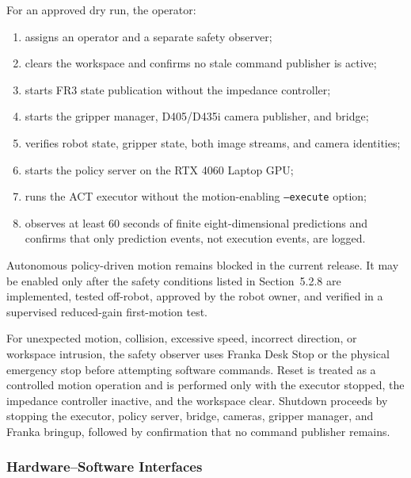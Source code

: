 \documentclass[12pt, letterpaper]{article}
\begin{document}
For an approved dry run, the operator:
\begin{enumerate}[label=(\arabic*)]
\item assigns an operator and a separate safety observer;
\item clears the workspace and confirms no stale command publisher is active;
\item starts FR3 state publication without the impedance controller;
\item starts the gripper manager, D405/D435i camera publisher, and bridge;
\item verifies robot state, gripper state, both image streams, and camera identities;
\item starts the policy server on the RTX 4060 Laptop GPU;
\item runs the ACT executor without the motion-enabling \texttt{--execute} option;
\item observes at least 60 seconds of finite eight-dimensional predictions and confirms that only prediction events, not execution events, are logged.
\end{enumerate}

Autonomous policy-driven motion remains blocked in the current release. It may be enabled only after the safety conditions listed in Section~5.2.8 are implemented, tested off-robot, approved by the robot owner, and verified in a supervised reduced-gain first-motion test.

For unexpected motion, collision, excessive speed, incorrect direction, or workspace intrusion, the safety observer uses Franka Desk Stop or the physical emergency stop before attempting software commands. Reset is treated as a controlled motion operation and is performed only with the executor stopped, the impedance controller inactive, and the workspace clear. Shutdown proceeds by stopping the executor, policy server, bridge, cameras, gripper manager, and Franka bringup, followed by confirmation that no command publisher remains.

\subsubsection{Hardware--Software Interfaces}
\end{document}
